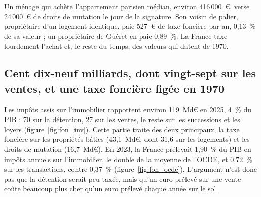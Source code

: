 
Un ménage qui achète l'appartement parisien médian, environ 416\,000~€, verse 24\,000~€ de droits de mutation le jour
de la signature. Son voisin de palier, propriétaire d'un logement identique, paie 527~€ de taxe foncière par an, 0,13~\%
de sa valeur ; un propriétaire de Guéret en paie 0,89~\%. La France taxe lourdement l'achat et, le reste du temps, des
valeurs qui datent de 1970.

\subsection{Cent dix-neuf milliards, dont vingt-sept sur les ventes, et une taxe foncière figée en 1970}

Les impôts assis sur l'immobilier rapportent environ 119~Md€ en 2025, 4~\% du PIB : 70 sur la détention, 27 sur les
ventes, le reste sur les successions et les loyers (figure~\ref{fig:fon_inv}). Cette partie traite des deux principaux,
la taxe foncière sur les propriétés bâties (43,1~Md€, dont 31,6 sur les logements) et les droits de mutation
(16,7~Md€). En 2023, la France prélevait 1,90~\% du PIB en impôts annuels sur l'immobilier, le double de la moyenne de l'OCDE, et
0,72~\% sur les transactions, contre 0,37~\% (figure~\ref{fig:fon_ocde}). L'argument n'est donc pas que la détention
serait peu taxée, mais qu'un euro prélevé sur une vente coûte beaucoup plus cher qu'un euro prélevé chaque année sur le
sol.


